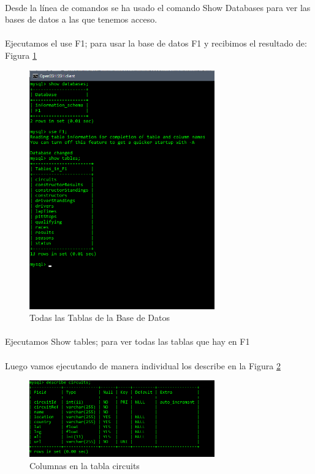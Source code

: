 \documentclass[a4paper 
,twoside
]{article}
\begin{document}
  \paragraph{}
  Desde la línea de comandos se ha usado el comando Show Databases para ver las bases de datos a las que tenemos acceso.

  \paragraph{}
  Ejecutamos el use F1; para usar la base de datos F1 y recibimos el resultado de: Figura \ref{fig:tablas}

  \begin{figure}[H]
    \centering
    \includegraphics[width=8cm]{tables.png}  
    \caption{Todas las Tablas de la Base de Datos}
    \label{fig:tablas}

  \end{figure}


  \paragraph{}
  Ejecutamos Show tables; para ver todas las tablas que hay en F1

  \paragraph{}
  Luego vamos ejecutando de manera individual los describe en la Figura \ref{fig:table_columns}

  \begin{figure}[H]
    \centering
    \includegraphics[width=8cm]{table_columns.png}
    \caption{Columnas en la tabla circuits}
    \label{fig:table_columns}
  \end{figure}
\end{document}
